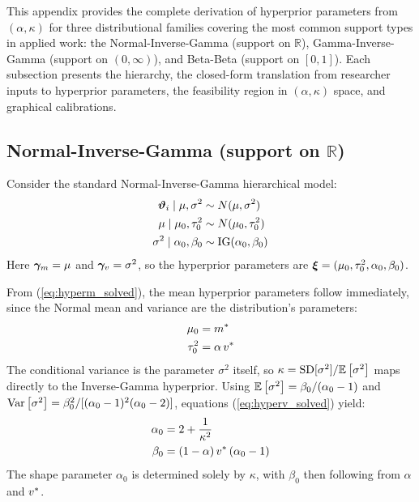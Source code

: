 \label{app:hyperprior_families}

This appendix provides the complete derivation of hyperprior parameters from
$(\alpha, \kappa)$ for three distributional families covering the most common
support types in applied work: the Normal-Inverse-Gamma (support on
$\mathbb{R}$), Gamma-Inverse-Gamma (support on $(0,\infty)$), and Beta-Beta
(support on $[0,1]$). Each subsection presents the hierarchy, the closed-form
translation from researcher inputs to hyperprior parameters, the feasibility
region in $(\alpha, \kappa)$ space, and graphical calibrations.

\subsection{Normal-Inverse-Gamma (support on $\mathbb{R}$)}
\label{app:nig}

Consider the standard Normal-Inverse-Gamma hierarchical model:
\begin{align}
\boldsymbol{\vartheta}_i \mid \mu, \sigma^2 &\sim N(\mu, \sigma^2) \\
\mu \mid \mu_0, \tau_0^2 &\sim N(\mu_0, \tau_0^2) \\
\sigma^2 \mid \alpha_0, \beta_0 &\sim \text{IG}(\alpha_0, \beta_0)
\end{align}
Here $\boldsymbol{\gamma}_m = \mu$ and $\boldsymbol{\gamma}_v = \sigma^2$, so the hyperprior parameters are
$\boldsymbol{\xi} = (\mu_0, \tau_0^2, \alpha_0, \beta_0)$.

From (\ref{eq:hyperm_solved}), the mean hyperprior parameters follow
immediately, since the Normal mean and variance are the distribution's
parameters:
\begin{align}
  \mu_0 &= m^* \\
  \tau_0^2 &= \alpha\,v^*
\end{align}
The conditional variance is the parameter $\sigma^2$ itself, so $\kappa =
\text{SD}[\sigma^2] / \mathbb{E}\left[\sigma^2\right]$ maps directly to the Inverse-Gamma
hyperprior. Using $\mathbb{E}\left[\sigma^2\right] = \beta_0 / (\alpha_0 - 1)$
and $\text{Var}\left[\sigma^2\right] = \beta_0^2 / [(\alpha_0 - 1)^2(\alpha_0 - 2)]$,
equations (\ref{eq:hyperv_solved}) yield:
\begin{align}
  \alpha_0 &= 2 + \frac{1}{\kappa^2} \\
  \beta_0 &= (1 - \alpha)\,v^*\,(\alpha_0 - 1)
\end{align}
The shape parameter $\alpha_0$ is determined solely by $\kappa$, with
$\beta_0$ then following from $\alpha$ and $v^*$.

